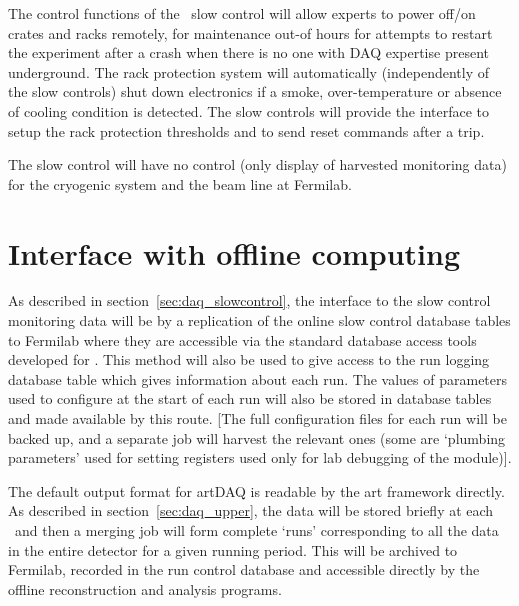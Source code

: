 The control functions of the \LBNE\ slow control will allow experts to
power off/on crates and racks remotely, for maintenance out-of hours
for attempts to restart the experiment after a crash when there is
no one with DAQ expertise present underground.  The rack protection
system will automatically (independently of the slow controls) shut
down electronics if a smoke, over-temperature or absence of cooling
condition is detected.  The slow controls will provide the interface
to setup the rack protection thresholds and to send reset commands
after a trip.

The slow control will have no control (only display of harvested
monitoring data) for the cryogenic system and the beam line at Fermilab.

\section{Interface with offline computing}
\label{sec:daq_offline}

As described in section~\ref{sec:daq_slowcontrol}, the interface to
the slow control monitoring data will be by a replication of the
online slow control database tables to Fermilab where they are
accessible via the standard database access tools developed for
\LBNE.  This method will also be used to give access to the run logging
database table which gives information about each run.  The values of
parameters used to configure at the start of each run will also be
stored in database tables and made available by this route. [The full
configuration files for each run will be backed up, and a separate job
will harvest the relevant ones (some are `plumbing parameters' used
for setting registers used only for lab debugging of the module)].

The default output format for artDAQ is readable by the art framework
directly.  As described in section~\ref{sec:daq_upper}, the data will be
stored briefly at each \COMPARTMENT\ and then a merging job will form
complete `runs' corresponding to all the data in the entire detector
for a given running period.  This will be archived to Fermilab, recorded in the
run control database and accessible directly by the offline
reconstruction and analysis programs.

